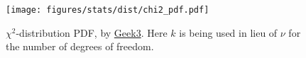 \begin{figure}
\centering
\texttt{[image: figures/stats/dist/chi2\_pdf.pdf]}
\caption{
$\chi^{2}$-distribution PDF,
by \href{https://en.wikipedia.org/wiki/File:Chi-square_pdf.svg}{Geek3}.
Here $k$ is being used in lieu of $\nu$ for the number of degrees of freedom.
}
\label{fig:dist:chi2}
\end{figure}
